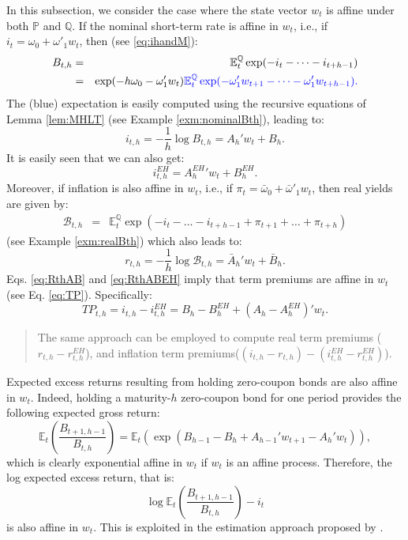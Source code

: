 \documentclass[
  12pt,
]{book}
\theoremstyle{definition}
\theoremstyle{definition}
\theoremstyle{definition}
\theoremstyle{definition}
\theoremstyle{remark}
\begin{document}
In this subsection, we consider the case where the state vector \(w_t\) is affine under both \(\mathbb{P}\) and \(\mathbb{Q}\). If the nominal short-term rate is affine in \(w_t\), i.e., if \(i_t = \omega_0 + \omega'_1 w_t\), then (see \eqref{eq:ihandM}):
\begin{eqnarray*}
B_{t,h} &=& \mathbb{E}^{\mathbb{Q}}_t \exp (-i_{t}-\dots-i_{t+h-1})\\
&=& \exp(-h\omega_0 - \omega'_1 w_t) \color{blue}{\mathbb{E}^{\mathbb{Q}}_t \exp (- \omega'_1 w_{t+1}-\dots- \omega'_1 w_{t+h-1})}.
\end{eqnarray*}
The (blue) expectation is easily computed using the recursive equations of Lemma \ref{lem:MHLT} (see Example \ref{exm:nominalBth}), leading to:
\begin{equation}
i_{t,h}= -  \frac{1}{h}   \log   B_{t,h} = A_h'w_t + B_h.\label{eq:RthAB}
\end{equation}
It is easily seen that we can also get:
\begin{equation}
i^{EH}_{t,h} = {A^{EH}_h}'w_t + B^{EH}_h.\label{eq:RthABEH}
\end{equation}
Moreover, if inflation is also affine in \(w_t\), i.e., if \(\pi_{t} = \bar\omega_0 + \bar\omega'_1 w_t\), then real yields are given by:
\begin{eqnarray*}
\mathcal{B}_{t,h} &=& \mathbb{E}^{\mathbb{Q}}_t \exp(-i_{t}-\dots-i_{t+h-1}+\pi_{t+1}+\dots+\pi_{t+h})
\end{eqnarray*}
(see Example \ref{exm:realBth}) which also leads to:
\begin{equation}
r_{t,h} = -  \frac{1}{h}   \log   \mathcal{B}_{t,h} = \bar{A}_h'w_t + \bar{B}_h.\label{eq:RbarthAB}
\end{equation}
Eqs. \eqref{eq:RthAB} and \eqref{eq:RthABEH} imply that term premiums are affine in \(w_t\) (see Eq. \eqref{eq:TP}). Specifically:
\[
TP_{t,h} = i_{t,h} - i^{EH}_{t,h} = B_h - B_h^{EH} + (A_h - A_h^{EH})'w_t.
\]

\begin{quote}
The same approach can be employed to compute real term premiums (\(r_{t,h} - r^{EH}_{t,h}\)), and inflation term premiums(\((i_{t,h}-r_{t,h}) - (i^{EH}_{t,h}-r^{EH}_{t,h})\)).
\end{quote}

Expected excess returns resulting from holding zero-coupon bonds are also affine in \(w_t\). Indeed, holding a maturity-\(h\) zero-coupon bond for one period provides the following expected gross return:
\[
\mathbb{E}_t\left(\frac{B_{t+1,h-1}}{B_{t,h}}\right) = \mathbb{E}_t\left(\exp(B_{h-1} - B_h + A_{h-1}'w_{t+1} - A_h'w_{t})\right),
\]
which is clearly exponential affine in \(w_t\) if \(w_t\) is an affine process. Therefore, the log expected excess return, that is:
\[
\log \mathbb{E}_t\left(\frac{B_{t+1,h-1}}{B_{t,h}}\right) - i_t
\]
is also affine in \(w_t\). This is exploited in the estimation approach proposed by \citet{Adrian_Crump_Moench_2013}.
\end{document}
